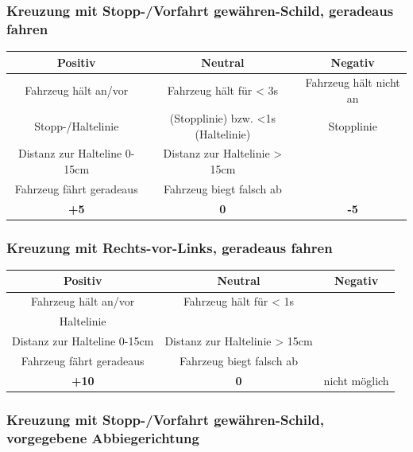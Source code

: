 \documentclass[a4paper, 11pt,usegeometry]{scrartcl}
\begin{document}
\subsubsection*{Kreuzung mit Stopp-/Vorfahrt gewähren-Schild, geradeaus fahren}

\begin{table}[H]
\begin{tabular}{|c|c|c|}
\hline
\rowcolor[HTML]{CACACA} 
\textbf{Positiv} & \textbf{Neutral} & \textbf{Negativ} \\ \hline
Fahrzeug hält an/vor & Fahrzeug hält für < 3s & Fahrzeug hält nicht an \\
Stopp-/Haltelinie & (Stopplinie) bzw. <1s (Haltelinie) & Stopplinie \\ \hline
Distanz zur Halteline 0-15cm & Distanz zur Haltelinie > 15cm & \\ \hline
Fahrzeug fährt geradeaus & Fahrzeug biegt falsch ab & \\ \hline
\textbf{+5} & \textbf{0} & \textbf{-5} \\ \hline
\end{tabular}
\end{table}

\subsubsection*{Kreuzung mit Rechts-vor-Links, geradeaus fahren}

\begin{table}[H]
\begin{tabular}{|c|c|c|}
\hline
\rowcolor[HTML]{CACACA} 
\textbf{Positiv} & \textbf{Neutral} & \textbf{Negativ} \\ \hline
Fahrzeug hält an/vor & Fahrzeug hält für < 1s &  \\
Haltelinie &  &  \\ \hline
Distanz zur Halteline 0-15cm & Distanz zur Haltelinie > 15cm & \\ \hline
Fahrzeug fährt geradeaus & Fahrzeug biegt falsch ab & \\ \hline
\textbf{+10} & \textbf{0} & nicht möglich \\ \hline
\end{tabular}
\end{table}

\subsubsection*{Kreuzung mit Stopp-/Vorfahrt gewähren-Schild, vorgegebene Abbiegerichtung}
\end{document}
